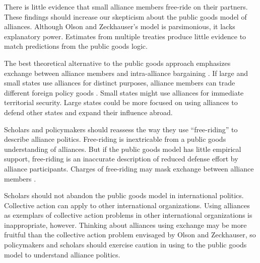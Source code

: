 \documentclass[12pt]{article}
\begin{document}
There is little evidence that small alliance members free-ride on their partners. 
These findings should increase our skepticism about the public goods model of alliances. 
Although Olson and Zeckhauser's model is parsimonious, it lacks explanatory power. 
Estimates from multiple treaties produce little evidence to match predictions from the public goods logic. 


The best theoretical alternative to the public goods approach emphasizes exchange between alliance members and intra-alliance bargaining \citep{Norrlof2010, Brooksetal2013, Kim2016}. 
If large and small states use alliances for distinct purposes, alliance members can trade different foreign policy goods \citep{Morrow1991, Johnson2015}. 
Small states might use alliances for immediate territorial security. 
Large states could be more focused on using alliances to defend other states and expand their influence abroad. 


Scholars and policymakers should reassess the way they use ``free-riding'' to describe alliance politics. 
Free-riding is inextricable from a public goods understanding of alliances.
But if the public goods model has little empirical support, free-riding is an inaccurate description of reduced defense effort by alliance participants.  
Charges of free-riding may mask exchange between alliance members \citep{Lanoszka2015}. 


Scholars should not abandon the public goods model in international politics. 
Collective action can apply to other international organizations.   
Using alliances as exemplars of collective action problems in other international organizations is inappropriate, however. 
Thinking about alliances using exchange may be more fruitful than the collective action problem envisaged by Olson and Zeckhauser, so policymakers and scholars should exercise caution in using to the public goods model to understand alliance politics.  



\singlespace


 
\end{document}
